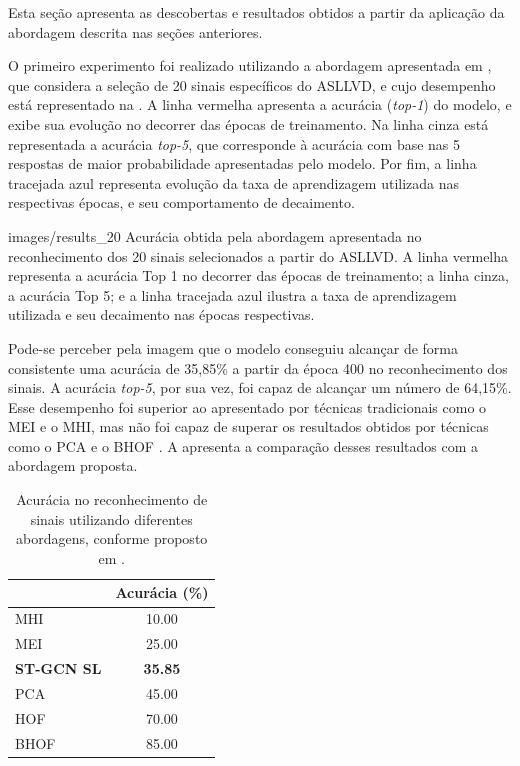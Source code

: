 Esta seção apresenta as descobertas e resultados obtidos a partir da aplicação da abordagem descrita nas seções anteriores. 

O primeiro experimento foi realizado utilizando a abordagem apresentada em \cite{lim-2016}, que considera a seleção de 20 sinais específicos do ASLLVD, e cujo desempenho está representado na . A linha vermelha apresenta a acurácia (\textit{top-1}) do modelo, e exibe sua evolução no decorrer das épocas de treinamento. Na linha cinza está representada a acurácia \textit{top-5}, que corresponde à acurácia com base nas 5 respostas de maior probabilidade apresentadas pelo modelo. Por fim, a linha tracejada azul representa evolução da taxa de aprendizagem utilizada nas respectivas épocas, e seu comportamento de decaimento.

    {images/results_20}
    {Acurácia obtida pela abordagem apresentada no reconhecimento dos 20 sinais selecionados a partir do ASLLVD. A linha vermelha representa a acurácia Top 1 no decorrer das épocas de treinamento; a linha cinza, a acurácia Top 5; e a linha tracejada azul ilustra a taxa de aprendizagem utilizada e seu decaimento nas épocas respectivas.}

Pode-se perceber pela imagem que o modelo conseguiu alcançar de forma consistente uma acurácia de 35,85\% a partir da época 400 no reconhecimento dos sinais. A acurácia \textit{top-5}, por sua vez, foi capaz de alcançar um número de 64,15\%. Esse desempenho foi superior ao apresentado por técnicas tradicionais como o MEI e o MHI, mas não foi capaz de superar os resultados obtidos por técnicas como o PCA e o BHOF \cite{lim-2016}. A  apresenta a comparação desses resultados com a abordagem proposta.

\begin{table}[ht]
\centering
\caption{Acurácia no reconhecimento de sinais utilizando diferentes abordagens, conforme proposto em \cite{lim-2016}.}
\label{tab:results-comparison-20}
\begin{tabular}{lc}
\hline
                   & Acurácia (\%)  \\ \hline
MHI                & 10.00                     \\
MEI                & 25.00                     \\
\textbf{ST-GCN SL} & \textbf{35.85}            \\
PCA                & 45.00                     \\
HOF                & 70.00                     \\
BHOF               & 85.00                     \\ \hline
\end{tabular}
\end{table}


